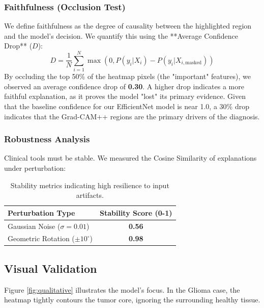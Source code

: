 \documentclass[a4paper,11pt]{article}
\begin{document}
\subsubsection{Faithfulness (Occlusion Test)}
We define faithfulness as the degree of causality between the highlighted region and the model's decision. We quantify this using the **Average Confidence Drop** ($D$):
\begin{equation}
D = \frac{1}{N} \sum_{i=1}^N \max(0, P(y_i | X_i) - P(y_i | X_{i, \text{masked}}))
\end{equation}
By occluding the top 50\% of the heatmap pixels (the "important" features), we observed an average confidence drop of \textbf{0.30}. A higher drop indicates a more faithful explanation, as it proves the model "lost" its primary evidence. Given that the baseline confidence for our EfficientNet model is near 1.0, a 30\% drop indicates that the Grad-CAM++ regions are the primary drivers of the diagnosis.

\subsubsection{Robustness Analysis}
Clinical tools must be stable. We measured the Cosine Similarity of explanations under perturbation:
\begin{table}[H]
\centering
\begin{tabular}{lc}
\toprule
\textbf{Perturbation Type} & \textbf{Stability Score (0-1)} \\
\midrule
Gaussian Noise ($\sigma=0.01$) & \textbf{0.56} \\
Geometric Rotation ($\pm 10^{\circ}$) & \textbf{0.98} \\
\bottomrule
\end{tabular}
\caption{Stability metrics indicating high resilience to input artifacts.}
\label{tab:stability}
\end{table}

\subsection{Visual Validation}
Figure \ref{fig:qualitative} illustrates the model's focus. In the Glioma case, the heatmap tightly contours the tumor core, ignoring the surrounding healthy tissue.
\end{document}
